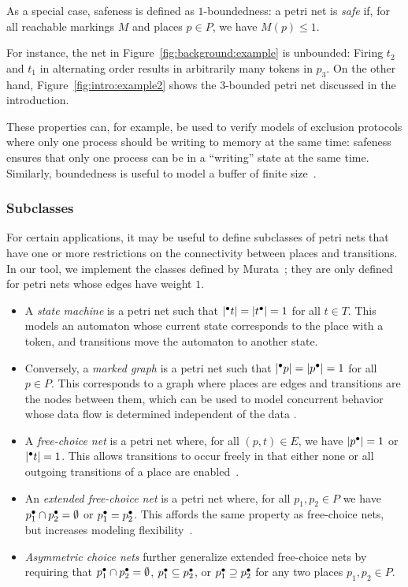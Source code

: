 As a special case, safeness is defined as $1$-boundedness: a petri net is \emph{safe} if, for all reachable markings $M$ and places $p\in P$, we have $M(p)\le 1$.

For instance, the net in Figure~\ref{fig:background:example} is unbounded: Firing $t_2$ and $t_1$ in alternating order results in arbitrarily many tokens in $p_3$. On the other hand, Figure~\ref{fig:intro:example2} shows the 3-bounded petri net discussed in the introduction.

These properties can, for example, be used to verify models of exclusion protocols where only one process should be writing to memory at the same time: safeness ensures that only one process can be in a ``writing'' state at the same time. Similarly, boundedness is useful to model a buffer of finite size~\cite{murata1989petri}.

\subsubsection{Subclasses}

For certain applications, it may be useful to define subclasses of petri nets that have one or more restrictions on the connectivity between places and transitions. In our tool, we implement the classes defined by Murata~\cite{murata1989petri}; they are only defined for petri nets whose edges have weight $1$.

\begin{itemize}
    \item A \emph{state machine} is a petri net such that $\left|{}^\bullet t\right|=\left|t{}^\bullet\right|=1$ for all $t\in T$. This models an automaton whose current state corresponds to the place with a token, and transitions move the automaton to another state.
    \item Conversely, a \emph{marked graph} is a petri net such that $\left|{}^\bullet p\right|=\left|p{}^\bullet\right|=1$ for all $p\in P$. This corresponds to a graph where places are edges and transitions are the nodes between them, which can be used to model concurrent behavior whose data flow is determined independent of the data \cite{commoner1971marked}.
    \item A \emph{free-choice net} is a petri net where, for all $(p,t)\in E$, we have $\left|p{}^\bullet\right|=1$ or $\left|{}^\bullet t\right|=1$. This allows transitions to occur freely in that either none or all outgoing transitions of a place are enabled~\cite{desel2005free}.
    \item An \emph{extended free-choice net} is a petri net where, for all $p_1,p_2\in P$ we have $p{}^\bullet_1\cap p{}^\bullet_2=\emptyset$ or $p{}^\bullet_1=p{}^\bullet_2$. This affords the same property as free-choice nets, but increases modeling flexibility~\cite{desel2005free}.
    \item \emph{Asymmetric choice nets} further generalize extended free-choice nets by requiring that $p{}^\bullet_1\cap p{}^\bullet_2=\emptyset$, $p{}^\bullet_1\subseteq p{}^\bullet_2$, or $p{}^\bullet_1\supseteq p{}^\bullet_2$ for any two places $p_1,p_2\in P$.
\end{itemize}

